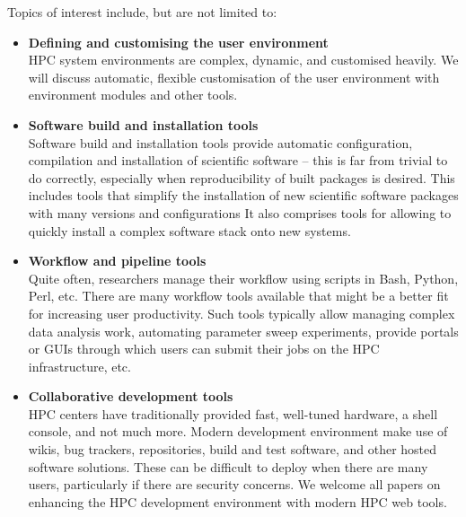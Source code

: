 \documentclass[a4paper,10pt]{article}
\begin{document}
\vspace{1em}
\noindent
Topics of interest include, but are not limited to:
\vspace{1em}
\begin{itemize}
    \item \textbf{Defining and customising the user environment}\\
    HPC system environments are complex, dynamic, and customised
    heavily.  We will discuss automatic, flexible customisation of the user
    environment with environment modules and other tools.

    \item \textbf{Software build and installation tools}\\
    Software build and installation tools provide automatic configuration, 
    compilation and installation of
    scientific software -- this is far from trivial to do correctly,
    especially when reproducibility of built packages is desired. This includes
    tools that simplify the installation of new scientific software packages
    with many versions and configurations
	It also comprises tools for allowing to
    quickly install a complex software stack onto new systems.


    \item \textbf{Workflow and pipeline tools }\\
    Quite often, researchers manage their workflow using scripts in
    Bash, Python, Perl, etc. There are many workflow tools available that might
    be a better fit for increasing user productivity. Such tools typically allow managing
    complex data analysis work, automating parameter sweep experiments, provide portals
    or GUIs through which users can submit their jobs on the HPC infrastructure, etc.

	\item \textbf{Collaborative development tools}\\
	HPC centers have traditionally provided fast, well-tuned hardware, a shell
	console, and not much more.  Modern development environment make use of wikis, 
	bug trackers, repositories, build and test software, and other hosted software
	solutions.  These can be difficult to deploy when there are many users,
	particularly if there are security concerns.  We welcome all papers on enhancing
	the HPC development environment with modern HPC web tools.
	

\end{itemize}
\end{document}
